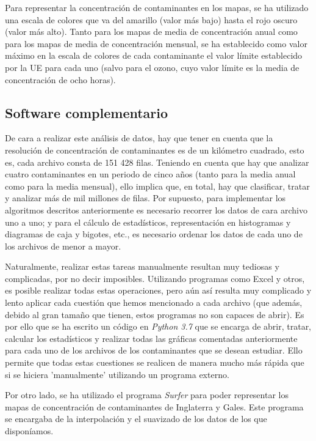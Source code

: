 \documentclass[12pt]{article}
\begin{document}
Para representar la concentración de contaminantes en los mapas, se ha utilizado una escala de colores que va del amarillo (valor más bajo) hasta el rojo oscuro (valor más alto). Tanto para los mapas de media de concentración anual como para los mapas de media de concentración mensual, se ha establecido como valor máximo en la escala de colores de cada contaminante el valor límite establecido por la UE para cada uno (salvo para el ozono, cuyo valor límite es la media de concentración de ocho horas).

\subsection{Software complementario}

De cara a realizar este análisis de datos, hay que tener en cuenta que la resolución de concentración de contaminantes es de un kilómetro cuadrado, esto es, cada archivo consta de 151 428 filas. Teniendo en cuenta que hay que analizar cuatro contaminantes en un periodo de cinco años (tanto para la media anual como para la media mensual), ello implica que, en total, hay que clasificar, tratar y analizar más de mil millones de filas. Por supuesto, para implementar los algoritmos descritos anteriormente es necesario recorrer los datos de cara archivo uno a uno; y para el cálculo de estadísticos, representación en histogramas y diagramas de caja y bigotes, etc., es necesario ordenar los datos de cada uno de los archivos de menor a mayor. 

Naturalmente, realizar estas tareas manualmente resultan muy tediosas y complicadas, por no decir imposibles. Utilizando programas como Excel y otros, es posible realizar todas estas operaciones, pero aún así resulta muy complicado y lento aplicar cada cuestión que hemos mencionado a cada archivo (que además, debido al gran tamaño que tienen, estos programas no son capaces de abrir). Es por ello que se ha escrito un código en \textit{Python 3.7} que se encarga de abrir, tratar, calcular los estadísticos y realizar todas las gráficas comentadas anteriormente para cada uno de los archivos de los contaminantes que se desean estudiar. Ello permite que todas estas cuestiones se realicen de manera mucho más rápida que si se hiciera 'manualmente' utilizando un programa externo.

Por otro lado, se ha utilizado el programa \textit{Surfer} para poder representar los mapas de concentración de contaminantes de Inglaterra y Gales. Este programa se encargaba de la interpolación y el suavizado de los datos de los que disponíamos.
\end{document}
